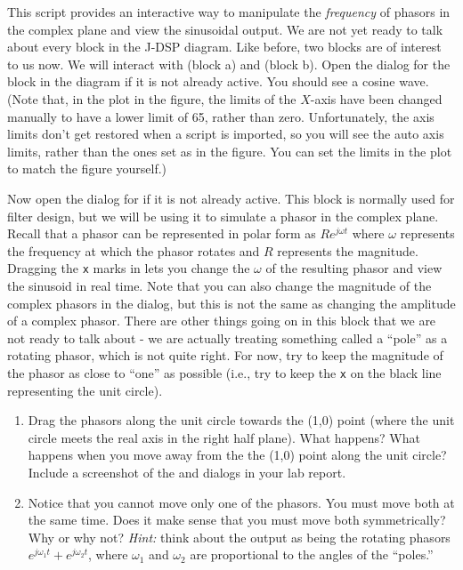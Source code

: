 This script provides an interactive way to manipulate the \textit{frequency} of phasors in the complex plane and view the sinusoidal output. We are not yet ready to talk about every block in the J-DSP diagram. Like before, two blocks are of interest to us now. We will interact with  (block a) and  (block b). Open the dialog for the  block in the diagram if it is not already active. You should see a cosine wave. (Note that, in the plot in the figure, the limits of the $X$-axis have been changed manually to have a lower limit of 65, rather than zero. Unfortunately, the axis limits don't get restored when a script is imported, so you will see the auto axis limits, rather than the ones set as in the figure. You can set the limits in the plot to match the figure yourself.)

Now open the dialog for  if it is not already active. This block is normally used for filter design, but we will be using it to simulate a phasor in the complex plane. Recall that a phasor can be represented in polar form as $Re^{j\omega t}$ where $\omega $ represents the frequency at which the phasor rotates and $R$ represents the magnitude. Dragging the \texttt{x} marks in  lets you change the $\omega $ of the resulting phasor and view the sinusoid in real time. Note that you can also change the magnitude of the complex phasors in the dialog, but this is not the same as changing the amplitude of a complex phasor. There are other things going on in this block that we are not ready to talk about - we are actually treating something called a ``pole'' as a rotating phasor, which is not quite right. For now, try to keep the magnitude of the phasor as close to ``one'' as possible (i.e., try to keep the \texttt{x} on the black line representing the unit circle). 

\begin{enumerate}
\item Drag the phasors along the unit circle towards the (1,0) point (where the unit circle meets the real axis in the right half plane). What happens? What happens when you move away from the the (1,0) point along the unit circle? Include a screenshot of the  and  dialogs in your lab report.


\item Notice that you cannot move only one of the phasors. You must move both at the same time. Does it make sense that you must move both symmetrically? Why or why not? \textit{Hint:} think about the output as being the rotating phasors $e^{j\omega_1 t}+e^{j\omega_2 t}$, where $\omega_1$ and $\omega_2 $ are proportional to the angles of the ``poles.''

\end{enumerate}


